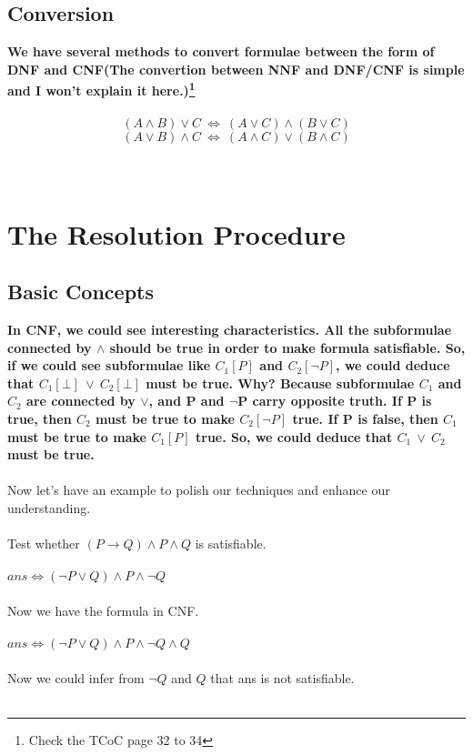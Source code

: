 \documentclass{article}
\begin{document}
\subsection{Conversion}
\textbf{We have several methods to convert formulae between the form of DNF and CNF(The convertion between NNF and DNF/CNF is simple and I won't explain it here.)\footnote{Check the TCoC page 32 to 34}}\\\\
$$(A \land B) \lor C \ \Leftrightarrow\  (A \lor C) \land (B \lor C)$$
$$(A \lor B) \land C \ \Leftrightarrow\  (A \land C) \lor (B \land C)$$\\\\

\section{The Resolution Procedure}
\subsection{Basic Concepts}
\textbf{In CNF, we could see interesting characteristics. All the subformulae connected by $\land$ should be true in order to make formula satisfiable. So, if we could see subformulae like $C_1[P]$ and $C_2[\neg P]$, we could deduce that $C_1[\bot]\ \lor\ C_2[\bot]$ must be true. Why? Because subformulae $C_1$ and $C_2$ are connected by $\lor$, and P and $\neg$P carry opposite truth. If P is true, then $C_2$ must be true to make $C_2[\neg P]$ true. If P is false, then $C_1$ must be true to make $C_1[P]$ true. So, we could deduce that $C_1\ \lor\ C_2$ must be true.}\\\\
Now let's have an example to polish our techniques and enhance our understanding.\\\\
Test whether $(P \rightarrow Q) \land P \land Q$ is satisfiable.\\\\
$ans \iff (\neg P \lor Q) \land P \land \neg Q$\\\\
Now we have the formula in CNF.\\\\
$ans \iff (\neg P \lor Q) \land P \land \neg Q \land Q$\\\\
Now we could infer from $\neg Q$ and $Q$ that ans is not satisfiable.\\\\
\end{document}
